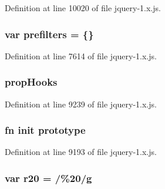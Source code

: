 Definition at line 10020 of file jquery-\/1.\+x.\+js.

\subsubsection[{\texorpdfstring{prefilters}{prefilters}}]{\setlength{\rightskip}{0pt plus 5cm}var prefilters = \{\}}\hypertarget{jquery-1_8x_8js_a5682e57225039bc5b0c2e80654930080}{}\label{jquery-1_8x_8js_a5682e57225039bc5b0c2e80654930080}


Definition at line 7614 of file jquery-\/1.\+x.\+js.

\subsubsection[{\texorpdfstring{prop\+Hooks}{propHooks}}]{ prop\+Hooks}\hypertarget{jquery-1_8x_8js_a5679fa4cd6152d76b96e19f7dfb8b057}{}\label{jquery-1_8x_8js_a5679fa4cd6152d76b96e19f7dfb8b057}


Definition at line 9239 of file jquery-\/1.\+x.\+js.

\subsubsection[{\texorpdfstring{prototype}{prototype}}]{ {\bf fn} {\bf init} prototype}\hypertarget{jquery-1_8x_8js_a7ef9b7a13e7ecdb967f1b98b4ada2470}{}\label{jquery-1_8x_8js_a7ef9b7a13e7ecdb967f1b98b4ada2470}


Definition at line 9193 of file jquery-\/1.\+x.\+js.

\subsubsection[{\texorpdfstring{r20}{r20}}]{\setlength{\rightskip}{0pt plus 5cm}var r20 = /\%20/{\bf g}}\hypertarget{jquery-1_8x_8js_a0e39f72d512af99fb5992d66f1a1c821}{}\label{jquery-1_8x_8js_a0e39f72d512af99fb5992d66f1a1c821}



